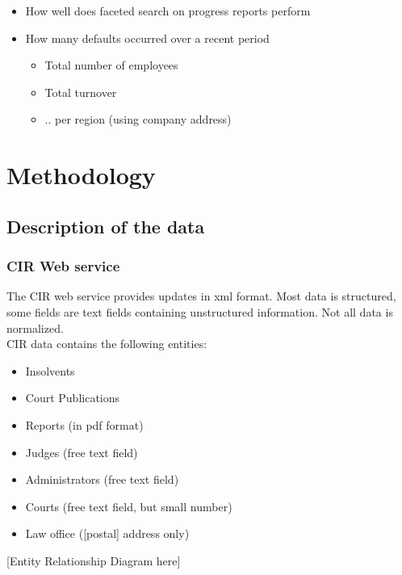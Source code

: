 \begin{itemize}
	\item How well does faceted search on progress reports perform
	\item How many defaults occurred over a recent period
	\begin{itemize}
		\item Total number of employees
		\item Total turnover
		\item .. per region (using company address)
	\end{itemize}

\end{itemize}

\section{Methodology}
\subsection{Description of the data}
\subsubsection{CIR Web service}
The CIR web service provides updates in xml format. Most data is structured, some fields are text fields containing unstructured information. Not all data is normalized.
\\
CIR data contains the following entities:
\begin{itemize}
	\item Insolvents
	\item Court Publications
	\item Reports (in pdf format)
	\item Judges (free text field)
	\item Administrators (free text field)
	\item Courts (free text field, but small number)
	\item Law office ([postal] address only)
\end{itemize}

[Entity Relationship Diagram here]

